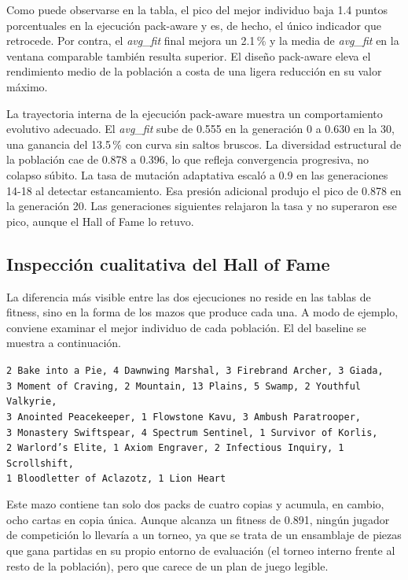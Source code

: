 Como puede observarse en la tabla, el pico del mejor individuo baja 1.4 puntos porcentuales en la ejecución pack-aware y es, de hecho, el único indicador que retrocede. Por contra, el \emph{avg\_fit} final mejora un 2.1\,\% y la media de \emph{avg\_fit} en la ventana comparable también resulta superior. El diseño pack-aware eleva el rendimiento medio de la población a costa de una ligera reducción en su valor máximo.

La trayectoria interna de la ejecución pack-aware muestra un comportamiento evolutivo adecuado. El \emph{avg\_fit} sube de 0.555 en la generación 0 a 0.630 en la 30, una ganancia del 13.5\,\% con curva sin saltos bruscos. La diversidad estructural de la población cae de 0.878 a 0.396, lo que refleja convergencia progresiva, no colapso súbito. La tasa de mutación adaptativa escaló a 0.9 en las generaciones 14-18 al detectar estancamiento. Esa presión adicional produjo el pico de 0.878 en la generación 20. Las generaciones siguientes relajaron la tasa y no superaron ese pico, aunque el Hall of Fame lo retuvo.

\subsection{Inspección cualitativa del Hall of Fame}

La diferencia más visible entre las dos ejecuciones no reside en las tablas de fitness, sino en la forma de los mazos que produce cada una. A modo de ejemplo, conviene examinar el mejor individuo de cada población. El del baseline se muestra a continuación.

\begin{center}
\small
\texttt{2 Bake into a Pie, 4 Dawnwing Marshal, 3 Firebrand Archer, 3 Giada,}\\
\texttt{3 Moment of Craving, 2 Mountain, 13 Plains, 5 Swamp, 2 Youthful Valkyrie,}\\
\texttt{3 Anointed Peacekeeper, 1 Flowstone Kavu, 3 Ambush Paratrooper,}\\
\texttt{3 Monastery Swiftspear, 4 Spectrum Sentinel, 1 Survivor of Korlis,}\\
\texttt{2 Warlord's Elite, 1 Axiom Engraver, 2 Infectious Inquiry, 1 Scrollshift,}\\
\texttt{1 Bloodletter of Aclazotz, 1 Lion Heart}
\end{center}

Este mazo contiene tan solo dos packs de cuatro copias y acumula, en cambio, ocho cartas en copia única. Aunque alcanza un fitness de 0.891, ningún jugador de competición lo llevaría a un torneo, ya que se trata de un ensamblaje de piezas que gana partidas en su propio entorno de evaluación (el torneo interno frente al resto de la población), pero que carece de un plan de juego legible.

